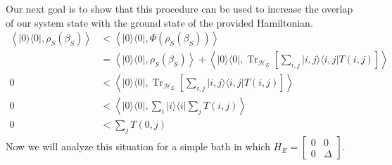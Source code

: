 \documentclass{article}
\newcommand{\ketbra}[2]{| #1\rangle\! \langle #2|}
\newcommand{\brackets}[1]{\left[ #1 \right]}
\newcommand{\anglebrackets}[1]{\left< #1 \right>}
\newcommand{\overlap}[2]{\anglebrackets{#1 , #2 }}
\DeclareMathOperator{\Tr}{Tr}
\newcommand{\partrace}[2]{\Tr_{#1} \brackets{ #2 }}
\newcommand{\hilb}{\mathcal{H}}
\begin{document}
Our next goal is to show that this procedure can be used to increase the overlap of our system state with the ground state of the provided Hamiltonian.
\begin{align}
    \overlap{\ketbra{0}{0}}{ \rho_S(\beta_S)} &< \overlap{\ketbra{0}{0}}{ \Phi(\rho_S(\beta_S))} \\
    &= \overlap{\ketbra{0}{0}}{ \rho_S(\beta_S)} + \overlap{\ketbra{0}{0}}{\partrace{\hilb_E}{\sum_{i,j} \ketbra{i,j}{i,j} T(i,j)}} \\
    0 &< \overlap{\ketbra{0}{0}}{ \partrace{\hilb_E}{\sum_{i,j} \ketbra{i,j}{i,j} T(i,j)}} \\
    0 &< \overlap{\ketbra{0}{0}}{ \sum_i \ketbra{i}{i} \sum_{j} T(i,j) } \\
    0 &< \sum_j T(0,j)
\end{align}
Now we will analyze this situation for a simple bath in which $H_E = \begin{bmatrix} 0 & 0 \\ 0 & \Delta \end{bmatrix}$. 
\end{document}
